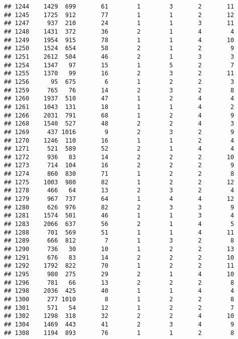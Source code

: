 \documentclass[]{article}
\begin{document}
\begin{verbatim}
## 1244    1429  699       61        1        3       2       11
## 1245    1725  912       77        1        1       2       12
## 1247     937  210       24        1        1       3       11
## 1248    1431  372       36        2        1       4        4
## 1249    1954  915       78        1        1       4       10
## 1250    1524  654       58        2        1       2        9
## 1251    2612  504       46        2        1       3        3
## 1254    1347   97       15        1        5       2        7
## 1255    1370   99       16        2        3       2       11
## 1256      95  675        6        1        2       2        3
## 1259     765   76       14        2        3       2        8
## 1260    1937  510       47        1        2       4        4
## 1261    1043  131       18        1        1       4        2
## 1266    2031  791       68        1        2       4        9
## 1268    1540  527       48        2        2       4        3
## 1269     437 1016        9        2        3       2        9
## 1270    1246  110       16        1        1       2        4
## 1271     521  589       52        2        1       4        4
## 1272     936   83       14        2        2       2       10
## 1273     714  104       16        2        2       2        9
## 1274     860  830       71        1        2       2        8
## 1275    1003  980       82        1        2       2       12
## 1278     466   64       13        2        3       2        4
## 1279     967  737       64        1        4       4       12
## 1280     626  976       82        2        3       3        9
## 1281    1574  501       46        1        1       3        4
## 1283    2066  637       56        2        1       4        5
## 1288     701  569       51        1        1       4       11
## 1289     666  812        7        1        3       2        8
## 1290     736   30       10        1        2       2       13
## 1291     676   83       14        2        2       2       10
## 1292    1792  822       70        1        2       2       11
## 1295     980  275       29        2        1       4       10
## 1296     781   66       13        2        2       2        8
## 1298    2036  425       40        1        1       4        4
## 1300     277 1010        8        1        2       2        8
## 1301     571   54       12        1        2       2        7
## 1302    1298  318       32        2        2       4       10
## 1304    1469  443       41        2        3       4        9
## 1308    1194  893       76        1        1       2        8

\end{verbatim}
\end{document}
